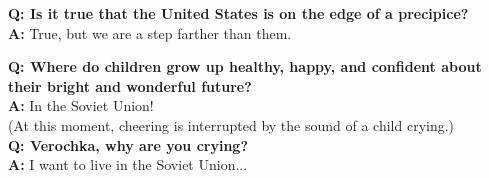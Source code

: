 {\medskip  
\textbf{Q: Is it true that the United States is on the edge of a precipice?} \\  
\textbf{A:} True, but we are a step farther than them.  

\medskip  
\medskip  
\textbf{Q: Where do children grow up healthy, happy, and confident about their bright and wonderful future?} \\  
\textbf{A:} In the Soviet Union!  
\\(At this moment, cheering is interrupted by the sound of a child crying.)\\
\textbf{Q: Verochka, why are you crying?} \\  
\textbf{A:} I want to live in the Soviet Union...  

}
